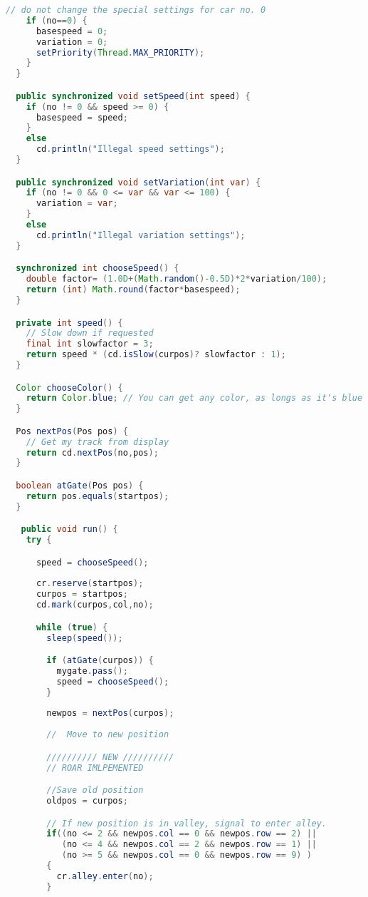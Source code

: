 \begin{lstlisting}[language=java]
    // do not change the special settings for car no. 0
    if (no==0) {
      basespeed = 0;  
      variation = 0; 
      setPriority(Thread.MAX_PRIORITY); 
    }
  }

  public synchronized void setSpeed(int speed) { 
    if (no != 0 && speed >= 0) {
      basespeed = speed;
    }
    else
      cd.println("Illegal speed settings");
  }

  public synchronized void setVariation(int var) { 
    if (no != 0 && 0 <= var && var <= 100) {
      variation = var;
    }
    else
      cd.println("Illegal variation settings");
  }

  synchronized int chooseSpeed() { 
    double factor= (1.0D+(Math.random()-0.5D)*2*variation/100);
    return (int) Math.round(factor*basespeed);
  }

  private int speed() {
    // Slow down if requested
    final int slowfactor = 3;  
    return speed * (cd.isSlow(curpos)? slowfactor : 1);
  }

  Color chooseColor() { 
    return Color.blue; // You can get any color, as longs as it's blue 
  }

  Pos nextPos(Pos pos) {
    // Get my track from display
    return cd.nextPos(no,pos);
  }

  boolean atGate(Pos pos) {
    return pos.equals(startpos);
  }

   public void run() {
    try {

      speed = chooseSpeed();
      
      cr.reserve(startpos);
      curpos = startpos;
      cd.mark(curpos,col,no);

      while (true) { 
        sleep(speed());

        if (atGate(curpos)) { 
          mygate.pass(); 
          speed = chooseSpeed();
        }
        	
        newpos = nextPos(curpos);
        
        //  Move to new position 

        ////////// NEW //////////
        // ROAR IMLPEMENTED

        //Save old position
        oldpos = curpos;

        // If new position is in valley, signal to enter alley.
        if((no <= 2 && newpos.col == 0 && newpos.row == 2) ||
           (no <= 4 && newpos.col == 2 && newpos.row == 1) ||
           (no >= 5 && newpos.col == 0 && newpos.row == 9) )
        {
          cr.alley.enter(no);
        }


\end{lstlisting}
